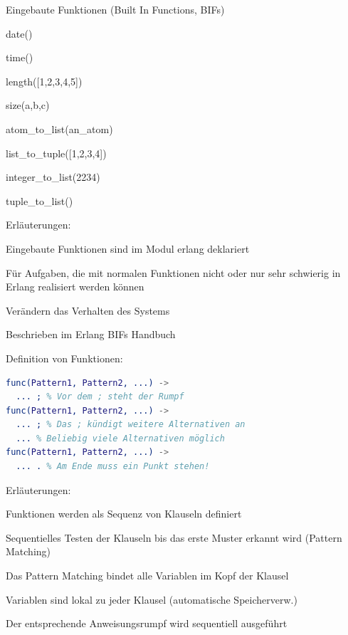 \documentclass[10pt]{article}
\begin{document}
Eingebaute Funktionen (Built In Functions, BIFs)
\begin{itemize*}
  \item date()
  \item time()
  \item length([1,2,3,4,5])
  \item size({a,b,c})
  \item atom\_to\_list(an\_atom)
  \item list\_to\_tuple([1,2,3,4])
  \item integer\_to\_list(2234)
  \item tuple\_to\_list({})
  \item Erläuterungen:
  \begin{itemize*}
    \item Eingebaute Funktionen sind im Modul erlang deklariert
    \item Für Aufgaben, die mit normalen Funktionen nicht oder nur sehr schwierig in Erlang realisiert werden können
    \item Verändern das Verhalten des Systems
    \item Beschrieben im Erlang BIFs Handbuch
  \end{itemize*}
\end{itemize*}

Definition von Funktionen:
\begin{lstlisting}[language=erlang]
func(Pattern1, Pattern2, ...) ->
  ... ; % Vor dem ; steht der Rumpf
func(Pattern1, Pattern2, ...) ->
  ... ; % Das ; kündigt weitere Alternativen an
  ... % Beliebig viele Alternativen möglich
func(Pattern1, Pattern2, ...) ->
  ... . % Am Ende muss ein Punkt stehen!
\end{lstlisting}
Erläuterungen:
\begin{itemize*}
  \item Funktionen werden als Sequenz von Klauseln definiert
  \item Sequentielles Testen der Klauseln bis das erste Muster erkannt wird (Pattern Matching)
  \item Das Pattern Matching bindet alle Variablen im Kopf der Klausel
  \item Variablen sind lokal zu jeder Klausel (automatische Speicherverw.)
  \item Der entsprechende Anweisungsrumpf wird sequentiell ausgeführt
\end{itemize*}
\end{document}
